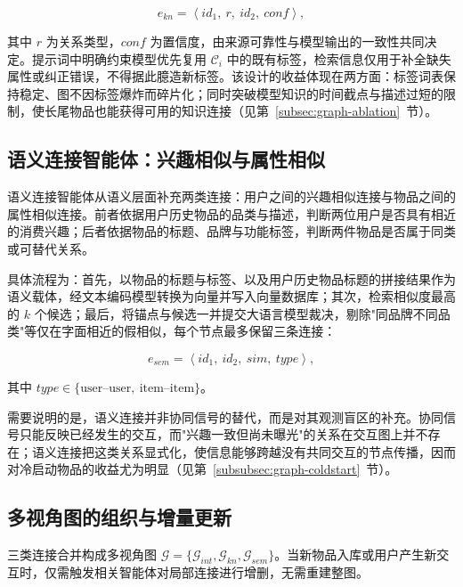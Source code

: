 \begin{equation}
  e_{kn} = \left\langle \mathit{id}_1,\ r,\ \mathit{id}_2,\ \mathit{conf} \right\rangle ,
  \label{eq:knowledge-tuple}
\end{equation}

其中 $r$ 为关系类型，$\mathit{conf}$ 为置信度，由来源可靠性与模型输出的一致性共同决定。提示词中明确约束模型优先复用 $\mathcal{C}_i$ 中的既有标签，检索信息仅用于补全缺失属性或纠正错误，不得据此臆造新标签。该设计的收益体现在两方面：标签词表保持稳定、图不因标签爆炸而碎片化；同时突破模型知识的时间截点与描述过短的限制，使长尾物品也能获得可用的知识连接（见第~\ref{subsec:graph-ablation}~节）。

\subsection{语义连接智能体：兴趣相似与属性相似}
\label{subsec:semantic-agent}

语义连接智能体从语义层面补充两类连接：用户之间的兴趣相似连接与物品之间的属性相似连接。前者依据用户历史物品的品类与描述，判断两位用户是否具有相近的消费兴趣；后者依据物品的标题、品牌与功能标签，判断两件物品是否属于同类或可替代关系。

具体流程为：首先，以物品的标题与标签、以及用户历史物品标题的拼接结果作为语义载体，经文本编码模型转换为向量并写入向量数据库；其次，检索相似度最高的 $k$ 个候选；最后，将锚点与候选一并提交大语言模型裁决，剔除"同品牌不同品类"等仅在字面相近的假相似，每个节点最多保留三条连接：

\begin{equation}
  e_{sem} = \left\langle \mathit{id}_1,\ \mathit{id}_2,\ \mathit{sim},\ \mathit{type} \right\rangle ,
  \label{eq:semantic-tuple}
\end{equation}

其中 $\mathit{type}\in\{\text{user--user},\ \text{item--item}\}$。

需要说明的是，语义连接并非协同信号的替代，而是对其观测盲区的补充。协同信号只能反映已经发生的交互，而"兴趣一致但尚未曝光"的关系在交互图上并不存在；语义连接把这类关系显式化，使信息能够跨越没有共同交互的节点传播，因而对冷启动物品的收益尤为明显（见第~\ref{subsubsec:graph-coldstart}~节）。

\subsection{多视角图的组织与增量更新}
\label{subsec:incremental}

三类连接合并构成多视角图 $\mathcal{G} = \{\mathcal{G}_{int}, \mathcal{G}_{kn}, \mathcal{G}_{sem}\}$。当新物品入库或用户产生新交互时，仅需触发相关智能体对局部连接进行增删，无需重建整图。

